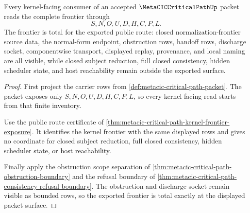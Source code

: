 \begin{theorem}
\label{thm:metacic-critical-path-kernel-frontier-totality}
Every kernel-facing consumer of an accepted $\MetaCICCriticalPathUp$ packet reads the complete frontier through
$$
S,N,O,U,D,H,C,P,L.
$$
The frontier is total for the exported public route: closed normalization-frontier source data, the normal-form endpoint, obstruction rows, handoff rows, discharge socket, componentwise transport, displayed replay, provenance, and local naming are all visible, while closed subject reduction, full closed consistency, hidden scheduler state, and host reachability remain outside the exported surface.
\end{theorem}
\begin{proof}
First project the carrier rows from \autoref{def:metacic-critical-path-packet}. The packet exposes only $S,N,O,U,D,H,C,P,L$, so every kernel-facing read starts from that finite inventory.

Use the public route certificate of \autoref{thm:metacic-critical-path-kernel-frontier-exposure}. It identifies the kernel frontier with the same displayed rows and gives no coordinate for closed subject reduction, full closed consistency, hidden scheduler state, or host reachability.

Finally apply the obstruction scope separation of \autoref{thm:metacic-critical-path-obstruction-boundary} and the refusal boundary of \autoref{thm:metacic-critical-path-consistency-refusal-boundary}. The obstruction and discharge socket remain visible as bounded rows, so the exported frontier is total exactly at the displayed packet surface.
\end{proof}

